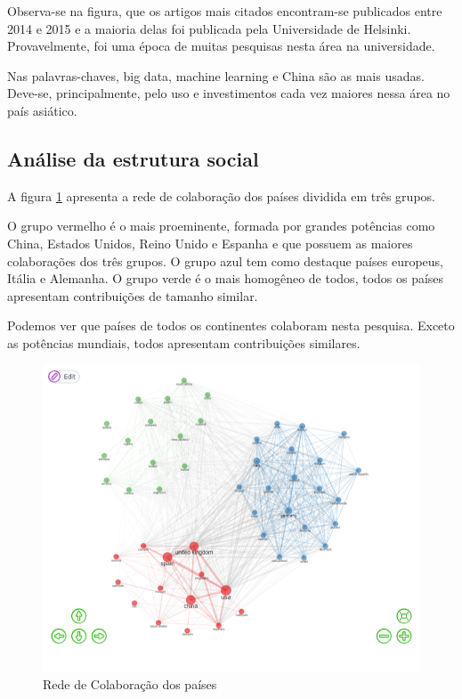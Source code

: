Observa-se na figura, que os artigos mais citados encontram-se publicados entre 2014 e 2015 e a maioria delas foi publicada pela Universidade de Helsinki. Provavelmente, foi uma época de muitas pesquisas nesta área na universidade.

Nas palavras-chaves, big data, machine learning e China são as mais usadas. Deve-se, principalmente, pelo uso e investimentos cada vez maiores nessa área no país asiático.


\subsection{Análise da estrutura social}
A figura \ref{fig:rede-tres} apresenta a rede de colaboração dos países dividida em três grupos. 

O grupo vermelho é o mais proeminente, formada por grandes potências como China, Estados Unidos, Reino Unido e Espanha e que possuem as maiores colaborações dos três grupos. O grupo azul tem como destaque países europeus, Itália e Alemanha. O grupo verde é o mais homogêneo de todos, todos os países apresentam contribuições de tamanho similar.

Podemos ver que países de todos os continentes colaboram nesta pesquisa. Exceto as potências mundiais, todos apresentam contribuições similares.

\begin{figure}[ht]
    \centering
    \includegraphics[width=12cm]{experiments/Tong00020/PesquisaBibliometrica/Social Structure/MASSA@Tong00020-Collaboration Network.png}
    \caption{Rede de Colaboração dos países}
    \label{fig:rede-tres}
\end{figure}

